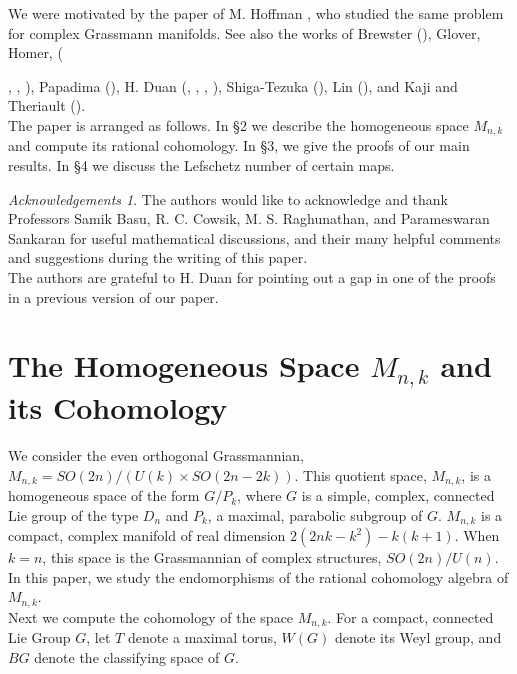 \documentclass[a4paper,leqno,12pt]{amsart}
\theoremstyle{plain}
\theoremstyle{definition}
\theoremstyle{remark}
\newtheorem*{ack}{Acknowledgements}
\begin{document}
\noindent
We were motivated by the paper of M. Hoffman \cite{hoff1}, who studied the same problem for complex Grassmann manifolds.  
 See also the works of Brewster (\cite{brew}),  Glover,  Homer,  ({\cite{hogr1},  \cite{hogr2},  \cite{hoho1}),  Papadima (\cite{padi}),  H. Duan (\cite{duan1},  \cite{duan2},  \cite{duan3},  \cite{duan4}),   Shiga-Tezuka  (\cite{shte}),   Lin (\cite{lin}), and Kaji and Theriault (\cite{kath}).  \\


\noindent
The paper is arranged as follows.  In \S 2 we describe the homogeneous space $M_{n,k}$ and compute its rational cohomology.   In \S 3,  we give the proofs of our main results. In \S 4 we discuss the Lefschetz number of certain maps.  \\

\begin{ack}
The authors would like to acknowledge and thank Professors  Samik Basu,  R.  C.  Cowsik,  M.  S.  Raghunathan,  and Parameswaran Sankaran for useful mathematical discussions,  and their many helpful comments and suggestions during  the writing of this paper.  \\
The authors are grateful to H. Duan for pointing out a gap in one of the proofs in a previous version of our paper.  
\end{ack}

\vspace{0.3cm}
 
\section{The Homogeneous Space $M_{n,k}$ and its Cohomology}

\noindent
 We consider the even orthogonal Grassmannian,  $M_{n,k} = SO(2n) / (U(k) \times SO(2n-2k))$.  
This quotient space, $M_{n,k}$, is a homogeneous space of the form $G/P_{k}$,  where $G$ is a simple,  complex,  connected Lie group of the type $D_{n}$ and $P_{k}$,  a maximal,  parabolic subgroup of $G$.  $M_{n,k}$ is a compact,  complex manifold of real dimension $2(2nk - k^{2}) -k(k+1)$.  When $k=n$,  this space is the Grassmannian of complex structures,  $SO(2n)/U(n)$.  In this paper,  we study the  endomorphisms of the rational cohomology algebra of $M_{n,k}$.  \\

\noindent
Next we compute the cohomology of the space $M_{n,k}$.  
For a compact,  connected Lie Group $G$,  let $T$ denote a maximal torus,  $W(G)$  denote its Weyl group,  and $BG$ denote the classifying space of $G$.  \\

}
\end{document}
